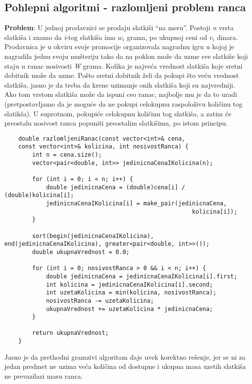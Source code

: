 \documentclass{article}
\begin{document}
\subsection{Pohlepni algoritmi - razlomljeni problem ranca}
\textbf{Problem}: U jednoj prodavnici se prodaju slatkiši “na meru”. Postoji \textit{n} vrsta slatkiša i znamo da \textit{i}-tog slatkiša ima $w_i$ grama, po ukupnoj ceni od $v_i$ dinara. Prodavnica je u okviru svoje promocije
organizovala nagradnu igru u kojoj je nagradila jednu svoju mušteriju tako da na
poklon može da uzme sve slatkiše koji staju u ranac nosivosti \textit{W} grama. Kolika
je najveća vrednost slatkiša koje sretni dobitnik može da uzme.
\newline
Pošto sretni dobitnik želi da pokupi što veću vrednost slatkiša, jasno je da treba da krene uzimanje onih slatkiša koji su najvredniji. Ako tom vrstom slatkiša može da ispuni ceo ranac, najbolje mu je da to
uradi (pretpostavljamo da je moguće da ne pokupi celokupnu
raspoloživu količinu tog slatikša). U suprotnom, pokupiće celokupnu količinu
tog slatkiša, a zatim će preostalu nosivost ranca popuniti preostalim slatkišima,
po istom principu.
\begin{lstlisting}
    double razlomljeniRanac(const vector<int>& cena, 
    const vector<int>& kolicina, int nosivostRanca) {
        int n = cena.size();
        vector<pair<double, int>> jedinicnaCenaIKolicina(n);
        
        for (int i = 0; i < n; i++) {
            double jedinicnaCena = (double)cena[i] / (double)kolicina[i];
            jedinicnaCenaIKolicina[i] = make_pair(jedinicnaCena, 
                                                      kolicina[i]);
        }
        
        sort(begin(jedinicnaCenaIKolicina), end(jedinicnaCenaIKolicina), greater<pair<double, int>>());
        double ukupnaVrednost = 0.0;
        
        for (int i = 0; nosivostRanca > 0 && i < n; i++) {
            double jedinicnaCena = jedinicnaCenaIKolicina[i].first;
            int kolicina = jedinicnaCenaIKolicina[i].second;
            int uzetaKolicina = min(kolicina, nosivostRanca);
            nosivostRanca -= uzetaKolicina;
            ukupnaVrednost += uzetaKolicina * jedinicnaCena;
        }
        
        return ukupnaVrednost;
    }
\end{lstlisting}
Jasno je da prethodni gramzivi algoritam daje uvek korektno rešenje, jer se ni za
jedan predmet ne uzima veća količina od dostupne i ukupna masa uzetih slatkiša
ne prevazilazi masu ranca.
\end{document}
